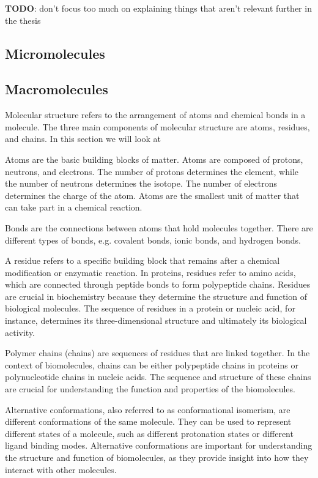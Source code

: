 \documentclass[
  digital,     %
  oneside,     %
  nosansbold,  %
  nocolorbold, %
  lof,         %
  lot,         %
]{fithesis4}
\begin{document}
\textbf{TODO}: don't focus too much on explaining things that aren't relevant further in the thesis \\

\subsection{Micromolecules}

\subsection{Macromolecules}

Molecular structure refers to the arrangement of atoms and chemical bonds in a molecule. The three main components of molecular structure are atoms, residues, and chains.
In this section we will look at

Atoms are the basic building blocks of matter. Atoms are composed of protons, neutrons, and electrons. The number of protons determines the element, while the number of neutrons determines the isotope. The number of electrons determines the charge of the atom. Atoms are the smallest unit of matter that can take part in a chemical reaction.

Bonds are the connections between atoms that hold molecules together. There are different types of bonds, e.g. covalent bonds, ionic bonds, and hydrogen bonds.

A residue refers to a specific building block that remains after a chemical modification or enzymatic reaction.
In proteins, residues refer to amino acids, which are connected through peptide bonds to form polypeptide chains.
Residues are crucial in biochemistry because they determine the structure and function of biological molecules.
The sequence of residues in a protein or nucleic acid, for instance, determines its three-dimensional structure and ultimately its biological activity.

Polymer chains (chains) are sequences of residues that are linked together. In the context of biomolecules, chains can be either polypeptide chains in proteins or polynucleotide chains in nucleic acids. The sequence and structure of these chains are crucial for understanding the function and properties of the biomolecules.

Alternative conformations, also referred to as conformational isomerism, are different conformations of the same molecule. They can be used to represent different states of a molecule, such as different protonation states or different ligand binding modes. Alternative conformations are important for understanding the structure and function of biomolecules, as they provide insight into how they interact with other molecules.
\end{document}
